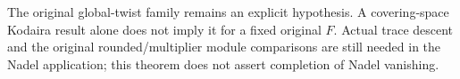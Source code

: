 The original global-twist family remains an explicit hypothesis. A
covering-space Kodaira result alone does not imply it for a fixed original
$F$. Actual trace descent and the original rounded/multiplier module
comparisons are still needed in the Nadel application; this theorem does
not assert completion of Nadel vanishing.
